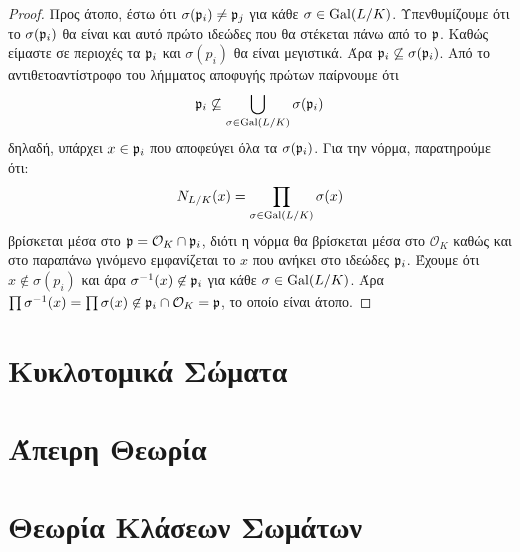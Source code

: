 \documentclass{report}
\begin{document}
\begin{proof} Προς άτοπο, έστω ότι $\sigma (\mathfrak{p}_i) \neq \mathfrak{p}_j$ για κάθε $\sigma \in \operatorname{Gal} (L/K)$. Υπενθυμίζουμε ότι το $\sigma (\mathfrak{p}_i)$ θα είναι και αυτό πρώτο ιδεώδες που θα στέκεται πάνω από το $\mathfrak{p}$. Καθώς είμαστε σε περιοχές  τα $\mathfrak{p}_i$ και $\sigma(p_i)$ θα είναι μεγιστικά. Άρα $\mathfrak{p}_i \not\subseteq \sigma(\mathfrak{p}_i)$. Από το αντιθετοαντίστροφο του λήμματος αποφυγής πρώτων παίρνουμε ότι 
	$$\mathfrak{p}_i \not\subseteq \bigcup\limits_{\sigma \in \operatorname{Gal} (L/K)} \sigma(\mathfrak{p}_i)$$ δηλαδή, υπάρχει $x \in \mathfrak{p}_i$ που αποφεύγει όλα τα $\sigma (\mathfrak{p}_i)$. Για την νόρμα, παρατηρούμε ότι:
	$$N_{L/K}(x) = \prod\limits_{\sigma \in \operatorname{Gal} (L/K)} \sigma(x)$$ βρίσκεται μέσα στο $\mathfrak{p} = \mathcal{O}_K \cap \mathfrak{p}_i$, διότι η νόρμα θα βρίσκεται μέσα στο $\mathcal{O}_K$ καθώς και στο παραπάνω γινόμενο εμφανίζεται το $x$ που ανήκει στο ιδεώδες $\mathfrak{p}_i$. Έχουμε ότι $x \not \in \sigma(p_i)$ και άρα $\sigma^{-1}(x) \not \in \mathfrak{p}_i$ για κάθε $\sigma \in \operatorname{Gal} (L/K)$. Άρα $\prod \sigma^{-1}(x) = \prod \sigma(x) \not \in \mathfrak{p}_i\cap \mathcal{O}_K = \mathfrak{p}$, το οποίο είναι άτοπο.
\end{proof}


\section{Κυκλοτομικά Σώματα}
\section{Άπειρη Θεωρία }
\section{Θεωρία Κλάσεων Σωμάτων}
\end{document}
